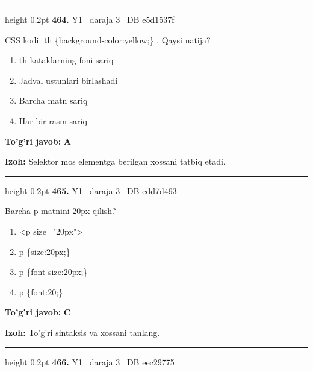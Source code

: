 \documentclass[10pt,a4paper,oneside]{article}
\begin{document}
\vspace{2mm}\hrule height 0.2pt \vspace{4mm}
\hypertarget{q464}{\textbf{\color{ink}464.}}  {\color{muted}\scriptsize Y1 \textbullet\ daraja 3 \textbullet\ DB e5d1537f}
\par
CSS kodi: th \{background-color:yellow;\} . Qaysi natija?
\begin{enumerate}[label=\Alph*),leftmargin=9mm]
\item th kataklarning foni sariq
\item Jadval ustunlari birlashadi
\item Barcha matn sariq
\item Har bir rasm sariq
\end{enumerate}
\begin{tcolorbox}[enhanced,breakable,colback=teal!4,colframe=teal!45!black,boxrule=0.45pt,arc=1.2mm,left=2.8mm,right=2.8mm,top=2mm,bottom=2mm,before skip=2mm,after skip=2mm]
\textbf{\color{teal}To'g'ri javob:} \textbf{A}
\par\smallskip
\textbf{Izoh:} Selektor mos elementga berilgan xossani tatbiq etadi.
\end{tcolorbox}
\vspace{2mm}\hrule height 0.2pt \vspace{4mm}
\hypertarget{q465}{\textbf{\color{ink}465.}}  {\color{muted}\scriptsize Y1 \textbullet\ daraja 3 \textbullet\ DB edd7d493}
\par
Barcha p matnini 20px qilish?
\begin{enumerate}[label=\Alph*),leftmargin=9mm]
\item \textless{}p size="20px"\textgreater{}
\item p \{size:20px;\}
\item p \{font-size:20px;\}
\item p \{font:20;\}
\end{enumerate}
\begin{tcolorbox}[enhanced,breakable,colback=teal!4,colframe=teal!45!black,boxrule=0.45pt,arc=1.2mm,left=2.8mm,right=2.8mm,top=2mm,bottom=2mm,before skip=2mm,after skip=2mm]
\textbf{\color{teal}To'g'ri javob:} \textbf{C}
\par\smallskip
\textbf{Izoh:} To'g'ri sintaksis va xossani tanlang.
\end{tcolorbox}
\vspace{2mm}\hrule height 0.2pt \vspace{4mm}
\hypertarget{q466}{\textbf{\color{ink}466.}}  {\color{muted}\scriptsize Y1 \textbullet\ daraja 3 \textbullet\ DB eec29775}
\end{document}

